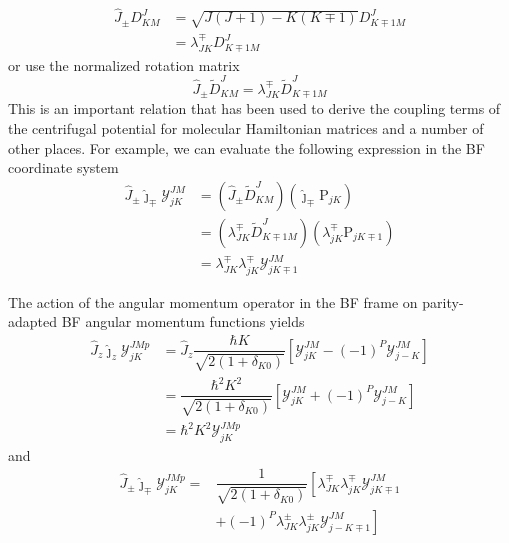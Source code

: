 \documentclass[]{article}
\begin{document}
\begin{align}
	\hat{J}_\pm D^J_{KM}&=\sqrt{J(J+1)-K(K\mp1)}D^J_{K\mp 1M}\nonumber\\
	&=\lambda^\mp_{JK}D^J_{K\mp 1M}
\end{align} 
or use the normalized rotation matrix
\begin{equation}
	\hat{J}_\pm\widetilde{D}^J_{KM}=\lambda^\mp_{JK}\widetilde{D}^J_{K\mp1M}
\end{equation}
This is an important relation that has been used to derive the coupling terms of the centrifugal potential for molecular Hamiltonian matrices and a number of other places. For example, we can evaluate the following expression in the BF coordinate system
\begin{align}
	\hat{J}_\pm\hat{\jmath}_\mp\mathcal{Y}^{JM}_{jK}&=(\hat{J}_\pm\widetilde{D}^J_{KM})(\hat{\jmath}_\mp\mathrm{P}_{jK})\nonumber\\
	&=(\lambda^\mp_{JK}\widetilde{D}^J_{K\mp1M})(\lambda^\mp_{jK}\mathrm{P}_{jK\mp1})\nonumber\\
	&=\lambda^\mp_{JK}\lambda^\mp_{jK}\mathcal{Y}^{JM}_{jK\mp1}
\end{align}

The action of the angular momentum operator in the BF frame on parity-adapted BF angular momentum functions yields
\begin{align}
	\hat{J}_z\hat{\jmath}_z\mathcal{Y}^{JMp}_{jK}&=	\hat{J}_z\dfrac{\hbar K}{\sqrt{2(1+\delta_{K0})}}[\mathcal{Y}^{JM}_{jK}-(-1)^P\mathcal{Y}^{JM}_{j-K}]\nonumber\\
	&=\dfrac{\hbar^2 K^2}{\sqrt{2(1+\delta_{K0})}}[\mathcal{Y}^{JM}_{jK}+(-1)^P\mathcal{Y}^{JM}_{j-K}]\nonumber\\
	&=\hbar^2K^2\mathcal{Y}^{JMp}_{jK}
	\label{d45}
\end{align}
and
\begin{align}
	\hat{J}_\pm\hat{\jmath}_\mp\mathcal{Y}^{JMp}_{jK}=&\dfrac{1}{\sqrt{2(1+\delta_{K0})}}\left[ \lambda^\mp_{JK}\lambda^\mp_{jK}\mathcal{Y}^{JM}_{jK\mp1}\right. \nonumber\\
	&\left. +(-1)^P\lambda^\pm_{JK}\lambda^\pm_{jK}\mathcal{Y}^{JM}_{j-K\mp1}\right] 
	\label{d46}
\end{align}
\end{document}
